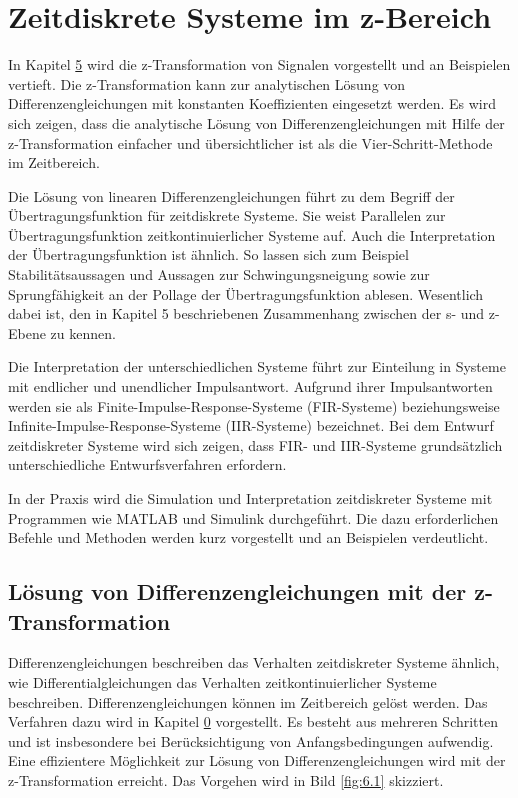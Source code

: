 \chapter{Zeitdiskrete Systeme im z-Bereich}\label{sec:zeitdiskrete-systeme-im-z-bereich}

In Kapitel \hyperref[z-transformation-von-signalen]{5} wird die z-Transformation von Signalen vorgestellt und an Beispielen vertieft. Die z-Transformation kann zur analytischen Lösung von Differenzengleichungen mit konstanten Koeffizienten eingesetzt werden. Es wird sich zeigen, dass die analytische Lösung von Differenzengleichungen mit Hilfe der z-Transformation einfacher und übersichtlicher ist als die Vier-Schritt-Methode im Zeitbereich.

Die Lösung von linearen Differenzengleichungen führt zu dem Begriff der Übertragungsfunktion für zeitdiskrete Systeme. Sie weist Parallelen zur Übertragungsfunktion zeitkontinuierlicher Systeme auf. Auch die Interpretation der Übertragungsfunktion ist ähnlich. So lassen sich zum Beispiel Stabilitätsaussagen und Aussagen zur Schwingungsneigung sowie zur Sprungfähigkeit an der Pollage der Übertragungsfunktion ablesen. Wesentlich dabei ist, den in Kapitel 5 beschriebenen Zusammenhang zwischen der s- und z-Ebene zu kennen.

Die Interpretation der unterschiedlichen Systeme führt zur Einteilung in Systeme mit endlicher und unendlicher Impulsantwort. Aufgrund ihrer Impulsantworten werden sie als Finite-Impulse-Response-Systeme (FIR-Systeme) beziehungsweise Infinite-Impulse-Response-Systeme (IIR-Systeme) bezeichnet. Bei dem Entwurf zeitdiskreter Systeme wird sich zeigen, dass FIR- und IIR-Systeme grundsätzlich unterschiedliche Entwurfsverfahren erfordern.

In der Praxis wird die Simulation und Interpretation zeitdiskreter Systeme mit Programmen wie MATLAB und Simulink durchgeführt. Die dazu erforderlichen Befehle und Methoden werden kurz vorgestellt und an Beispielen verdeutlicht.

\section{Lösung von Differenzengleichungen mit der z-Transformation}\label{sec:6.1}

Differenzengleichungen beschreiben das Verhalten zeitdiskreter Systeme ähnlich, wie Differentialgleichungen das Verhalten zeitkontinuierlicher Systeme beschreiben. Differenzengleichungen können im Zeitbereich gelöst werden. Das Verfahren dazu wird in Kapitel \hyperref[_Toc241453879]{0} vorgestellt. Es besteht aus mehreren Schritten und ist insbesondere bei Berücksichtigung von Anfangsbedingungen aufwendig. Eine effizientere Möglichkeit zur Lösung von Differenzengleichungen wird mit der z-Transformation erreicht. Das Vorgehen wird in Bild \ref{fig:6.1} skizziert.

